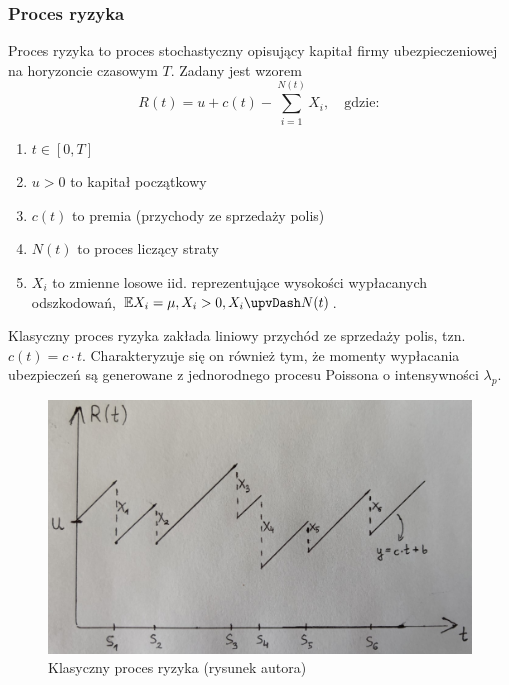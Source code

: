 \documentclass[12pt]{mwart}
\begin{document}
	\subsubsection{Proces ryzyka}
	\noindent Proces ryzyka to proces stochastyczny opisujący kapitał firmy ubezpieczeniowej na horyzoncie czasowym $T$. Zadany jest wzorem
	\begin{equation}
		R(t) = u + c(t) - \sum^{N(t)}_{i=1} X_i, \quad \mathrm{gdzie:} \label{ryzyko}
	\end{equation}
	
	\begin{enumerate}
	\itemsep 1mm
		\item $t \in [0,T]$
		\item $u > 0$ to kapitał początkowy 
		\item $c(t)$ to premia (przychody ze sprzedaży polis)
		\item $N(t)$ to proces liczący straty
		\item $X_i$ to zmienne losowe iid. reprezentujące wysokości wypłacanych odszkodowań, $\mathbb{E} X_i=\mu, X_i>0, X_i \upvDash N(t)$. 
	\end{enumerate}
	
	
	\noindent Klasyczny proces ryzyka zakłada liniowy przychód ze sprzedaży polis, tzn. $c(t)=c\cdot t$. Charakteryzuje się on również tym, że momenty wypłacania ubezpieczeń są generowane z jednorodnego procesu Poissona o intensywności $\lambda_{p}$. 
		
	\begin{figure}[H]
	\begin{center}
		\includegraphics[scale=0.25]{proces_ryzyka.jpg}
		\caption{Klasyczny proces ryzyka (rysunek autora)}
	\end{center}
	\end{figure}
	
\end{document}
